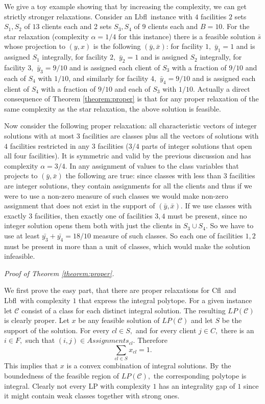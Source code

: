 \documentclass[11pt]{article}
\newcommand{\lbfl}{{\sc Lbfl}}
\newcommand{\cfl}{{\sc Cfl}}
\begin{document}
We give a toy example showing that by increasing the complexity, we can
get strictly stronger relaxations. Consider an \lbfl\ instance with $4$ facilities $2$ sets $S_1,S_2$
of $13$ clients each and 2 sets $S_3,S_4$ of $9$ clients each and $B=10$.  For the star relaxation
(complexity $\alpha=1/4$ for this instance)
there is a feasible solution $\bar{s}$ whose projection to $(y,x)$
 is the following $(\bar{y},\bar{x})$: for facility $1,$ $\bar{y}_1=1$ and is assigned $S_1$ integrally, for facility $2,$ $\bar{y}_2=1$ and is assigned $S_2$ integrally, for facility $3,$ $\bar{y}_3=9/10$ and is assigned each client of $S_3$ with a fraction of $9/10$ and each of $S_4$ with $1/10$, and similarly for facility $4,$ $\bar{y}_4=9/10$ and is assigned
each client of $S_4$ with a fraction of $9/10$ and each of $S_3$ with $1/10$. Actually
a direct consequence of Theorem \ref{theorem:proper} is that for any proper relaxation of the same complexity as the star relaxation, the above solution is feasible.

Now consider the following proper relaxation: all characteristic vectors 
of integer solutions with at most
$3$ facilities are classes plus all the 
vectors of solutions with $4$ facilities restricted in any $3$ facilities ($3/4$ parts of integer solutions that open all four facilities).
It is symmetric and valid by the previous discussion and has complexity $\alpha=3/4$. 
In any assignment of values to the class variables  that projects to $(\bar{y},\bar{x})$ the following are true:
since classes with less than $3$ facilities are integer solutions, they contain
assignments for all the clients and thus if we were 
to use a non-zero measure of such classes we would make non-zero assignment 
that does not exist in the support of $(\bar{y},\bar{x})$.
 If we use
classes with exactly $3$ facilities, then exactly one of facilities $3,4$ must be present, 
since no integer solution opens them both with just the clients in $S_3 \cup S_4$. 
So we have to use at least $\bar{y_3}+\bar{y_4}=18/10$ measure of such classes. 
So each one of facilities $1,2$
must be present in more than a unit of classes, which would make the solution infeasible.

\vspace*{0.8cm}

\noindent
{\em Proof of Theorem \ref{theorem:proper}.}

We first prove the easy part, 
that there are proper relaxations for \cfl\ and \lbfl\ with complexity $1$ that
express the integral polytope.
For a given instance let $\mathcal{C}$ consist of a class for each
distinct integral solution. The resulting $LP(\mathcal{C})$ is clearly
proper. Let $x$ be any feasible solution of $LP(\mathcal{C})$ and let
$S$ be the support of  the solution. For every $cl \in S,$ and 
for every client $j \in C,$ there is an $i \in F,$ such that $(i,j)
\in Assignments_{cl}.$ Therefore 
$$ \sum_{cl \in S} x_{cl} = 1.$$
This implies that $x$ is a convex combination of integral
solutions. By the boundedness of the feasible region of
$LP(\mathcal{C}),$ the  corresponding polytope is integral.  
Clearly not every LP with complexity $1$ has an integrality gap of $1$
since it might contain weak classes together with  strong
ones.
\end{document}
